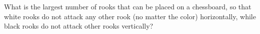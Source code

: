 \problem
What is the largest number of rooks that can be placed on a chessboard, so that
white rooks do not attack any other rook (no matter the color) horizontally,
while black rooks do not attack other rooks vertically?
\solution
\endproblem
